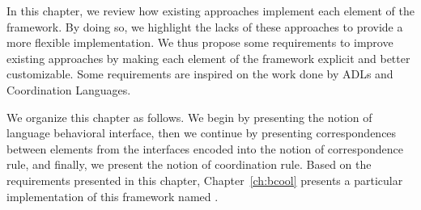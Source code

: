 In this chapter, we review how existing approaches implement each element of the framework. By doing so, we highlight the lacks of these approaches to provide a more flexible implementation.  We thus propose some requirements to improve existing approaches by making each element of the framework explicit and better customizable. Some requirements are inspired on the work done by ADLs and Coordination Languages. 

We organize this chapter as follows. We begin by presenting the notion of language behavioral interface, then we continue by presenting correspondences between elements from the interfaces encoded into the notion of correspondence rule, and finally, we present the notion of coordination rule. Based on the requirements presented in this chapter, Chapter~\ref{ch:bcool} presents a particular implementation of this framework named \bcool.

